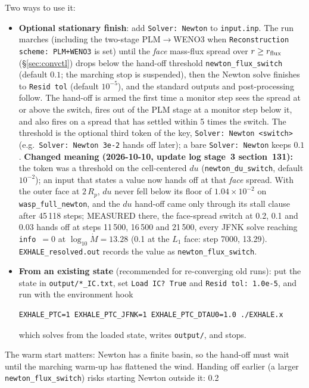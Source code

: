 \documentclass[english,a4paper]{my_memo}
\begin{document}
Two ways to use it:
\begin{itemize}
\item \textbf{Optional stationary finish}: add \texttt{Solver: Newton} to \texttt{input.inp}. The
  run marches (including the two-stage PLM$\to$WENO3 when
  \texttt{Reconstruction scheme: PLM+WENO3} is set) until the \emph{face}
  mass-flux spread over $r\ge r_{\rm flux}$ (\S\ref{sec:convctl}) drops below
  the hand-off threshold \texttt{newton\_flux\_switch} (default $0.1$; the
  marching stop is suspended), then the Newton solve finishes to
  \texttt{Resid tol} (default $10^{-5}$), and the standard outputs and
  post-processing follow. The hand-off is armed the first time a monitor step
  sees the spread at or above the switch, fires out of the PLM stage at a
  monitor step below it, and also fires on a spread that has settled within 5
  times the switch. The threshold is the optional third token of the key,
  \texttt{Solver: Newton <switch>} (e.g.\ \texttt{Solver: Newton 3e-2} hands
  off later); a bare \texttt{Solver: Newton} keeps $0.1$.
  \textbf{Changed meaning (2026-10-10, update log stage~3 section~131):} the
  token was a threshold on the cell-centered $du$ (\texttt{newton\_du\_switch},
  default $10^{-2}$); an input that states a value now hands off at that
  \emph{face} spread. With the outer face at $2\,R_p$, $du$ never fell below
  its floor of $1.04\times10^{-2}$ on \texttt{wasp\_full\_newton}, and the
  $du$ hand-off came only through its stall clause after 45\,118 steps;
  MEASURED there, the face-spread switch at 0.2, 0.1 and 0.03 hands off at
  steps 11\,500, 16\,500 and 21\,500, every JFNK solve reaching
  \texttt{info}~$=0$ at $\log_{10}\dot M=13.28$ (0.1 at the $L_1$ face: step
  7000, 13.29). \texttt{EXHALE\_resolved.out} records the value as
  \texttt{newton\_flux\_switch}.
\item \textbf{From an existing state} (recommended for re-converging old runs):
  put the state in \texttt{output/*\_IC.txt}, set \texttt{Load IC?\ True} and
  \texttt{Resid tol:\ 1.0e-5}, and run with the environment hook
\begin{lstlisting}[style=sh]
EXHALE_PTC=1 EXHALE_PTC_JFNK=1 EXHALE_PTC_DTAU0=1.0 ./EXHALE.x
\end{lstlisting}
  which solves from the loaded state, writes \texttt{output/}, and stops.
\end{itemize}
The warm start matters: Newton has a finite basin, so the hand-off must wait
until the marching warm-up has flattened the wind. Handing off earlier (a
larger \texttt{newton\_flux\_switch}) risks starting Newton outside it: 0.2
\end{document}

